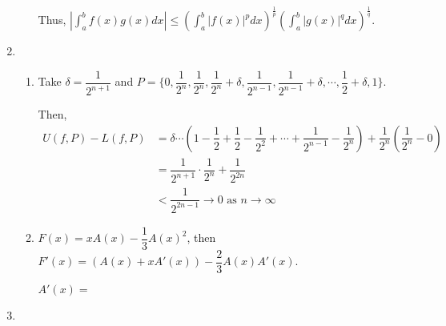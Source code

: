\documentclass[12pt]{article}
\begin{document}
\begin{enumerate}
\begin{enumerate}
        \newpage
        Thus, $|\displaystyle\int_a^b f(x) g(x) dx| \leq (\displaystyle\int_a^b |f(x)|^p dx)^{\frac{1}{p}} (\displaystyle\int_a^b |g(x)|^q dx)^{\frac{1}{q}}$.
    \end{enumerate}

    \item \begin{enumerate}
        \item Take $\delta = \dfrac{1}{2^{n+1}}$ and $P = \lbrace 0, \dfrac{1}{2^n}, \dfrac{1}{2^n}, \dfrac{1}{2^n} + \delta, \dfrac{1}{2^{n-1}}, \dfrac{1}{2^{n-1}} + \delta, \cdots, \dfrac{1}{2}+\delta, 1\rbrace$.

        Then, \begin{align*}
            U(f, P) - L(f, P) &= \delta \cdots (1 - \dfrac{1}{2} +\dfrac{1}{2} - \dfrac{1}{2^2} + \cdots + \dfrac{1}{2^{n-1}}-\dfrac{1}{2^n}) + \dfrac{1}{2^n}(\dfrac{1}{2^n} - 0)\\
            &= \dfrac{1}{2^{n+1}} \cdot \dfrac{1}{2^n} + \dfrac{1}{2^{2n}}\\
            &< \dfrac{1}{2^{2n-1}} \to 0\text{ as } n\to \infty
        \end{align*}

            \item $F(x) = xA(x) - \dfrac{1}{3}A(x)^2$, then $F'(x) = (A(x) + xA'(x)) - \dfrac{2}{3} A(x) A'(x)$.
            
            $A'(x) = $
    \end{enumerate}
    
    \item 
\end{enumerate}
\end{document}

